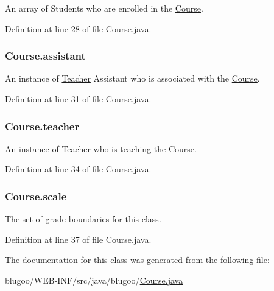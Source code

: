 An array of Students who are enrolled in the \hyperlink{classCourse}{Course}. 



Definition at line 28 of file Course.java.\hypertarget{classCourse_1a4e0b8a02c292d708ea189a3ec630ac}{
\subsubsection{ {\bf Course.assistant}}}
\label{classCourse_1a4e0b8a02c292d708ea189a3ec630ac}


An instance of \hyperlink{classTeacher}{Teacher} Assistant who is associated with the \hyperlink{classCourse}{Course}. 



Definition at line 31 of file Course.java.\hypertarget{classCourse_2e9ff59d7be67142a26b00e07695a1da}{
\subsubsection{ {\bf Course.teacher}}}
\label{classCourse_2e9ff59d7be67142a26b00e07695a1da}


An instance of \hyperlink{classTeacher}{Teacher} who is teaching the \hyperlink{classCourse}{Course}. 



Definition at line 34 of file Course.java.\hypertarget{classCourse_92119e5fc9ef69e7b3c26ba3d36a3c4e}{
\subsubsection{ {\bf Course.scale}}}
\label{classCourse_92119e5fc9ef69e7b3c26ba3d36a3c4e}


The set of grade boundaries for this class. 



Definition at line 37 of file Course.java.

The documentation for this class was generated from the following file:\begin{CompactItemize}
\item 
blugoo/WEB-INF/src/java/blugoo/\hyperlink{Course_8java}{Course.java}\end{CompactItemize}
